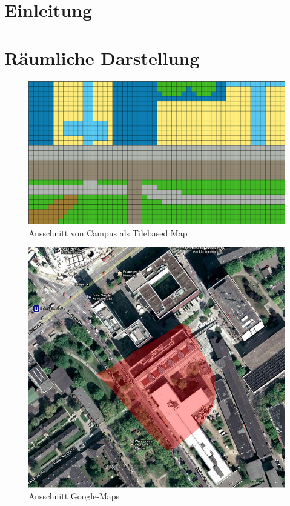 \documentclass[10pt]{scrartcl}
\author{André Harms, Oliver Steenbuck, Armin Steudte, Carsten Nötzel, Dennis Blauhut, Torben Becker}
\title{\titletext}
\date{26.10.2011}
\begin{document}
\maketitle

\setcounter{tocdepth}{3}
\tableofcontents
\listoffigures
\lstlistoflistings

\section{Einleitung}

\section{Räumliche Darstellung}

      \begin{figure}[htbp]
        \centering
                \includegraphics[scale=0.5]{img/tile_map_campus_pic}
        \caption{Ausschnitt von Campus als \glqq Tilebased Map\grqq{}}
        \label{img:tile_map}
        \end{figure}  
        
        
      \begin{figure}[htbp]
        \centering
                \includegraphics[scale=0.5]{img/google_maps}
        \caption{Ausschnitt Google-Maps}
        \label{img:google_maps}
        \end{figure}  
        
\end{document}
